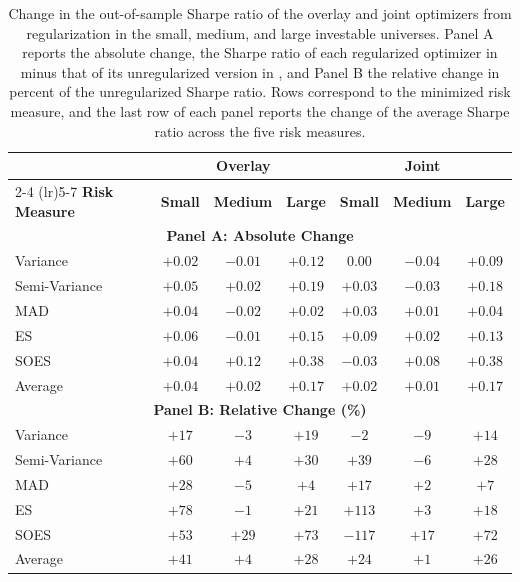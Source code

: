\begin{table}[bp]
  \centering
  \setlength{\tabcolsep}{8pt}
  \begin{tabular}{l*{6}{c}}
    \toprule
                          & \multicolumn{3}{c}{\textbf{Overlay}}             & \multicolumn{3}{c}{\textbf{Joint}} \\
    \cmidrule(lr){2-4} \cmidrule(lr){5-7}
    \textbf{Risk Measure} & \textbf{Small} & \textbf{Medium} & \textbf{Large} & \textbf{Small} & \textbf{Medium} & \textbf{Large} \\
    \midrule
    \multicolumn{7}{c}{\textbf{Panel A: Absolute Change}} \\
    \midrule
    Variance              & $+0.02$ & $-0.01$ & $+0.12$ & $0.00$ & $-0.04$ & $+0.09$ \\
    Semi-Variance         & $+0.05$ & $+0.02$ & $+0.19$ & $+0.03$ & $-0.03$ & $+0.18$ \\
    MAD                   & $+0.04$ & $-0.02$ & $+0.02$ & $+0.03$ & $+0.01$ & $+0.04$ \\
    ES                    & $+0.06$ & $-0.01$ & $+0.15$ & $+0.09$ & $+0.02$ & $+0.13$ \\
    SOES                  & $+0.04$ & $+0.12$ & $+0.38$ & $-0.03$ & $+0.08$ & $+0.38$ \\
    \midrule
    Average               & $+0.04$ & $+0.02$ & $+0.17$ & $+0.02$ & $+0.01$ & $+0.17$ \\
    \midrule
    \multicolumn{7}{c}{\textbf{Panel B: Relative Change (\%)}} \\
    \midrule
    Variance              & $+17$ & $-3$ & $+19$ & $-2$ & $-9$ & $+14$ \\
    Semi-Variance         & $+60$ & $+4$ & $+30$ & $+39$ & $-6$ & $+28$ \\
    MAD                   & $+28$ & $-5$ & $+4$ & $+17$ & $+2$ & $+7$ \\
    ES                    & $+78$ & $-1$ & $+21$ & $+113$ & $+3$ & $+18$ \\
    SOES                  & $+53$ & $+29$ & $+73$ & $-117$ & $+17$ & $+72$ \\
    \midrule
    Average               & $+41$ & $+4$ & $+28$ & $+24$ & $+1$ & $+26$ \\
    \bottomrule
  \end{tabular}
  \caption{Change in the out-of-sample Sharpe ratio of the overlay and joint optimizers from regularization in the small, medium, and large investable universes. Panel A reports the absolute change, the Sharpe ratio of each regularized optimizer in  minus that of its unregularized version in , and Panel B the relative change in percent of the unregularized Sharpe ratio. Rows correspond to the minimized risk measure, and the last row of each panel reports the change of the average Sharpe ratio across the five risk measures.}
  \label{tab:regularization-sharpe-change}
\end{table}

